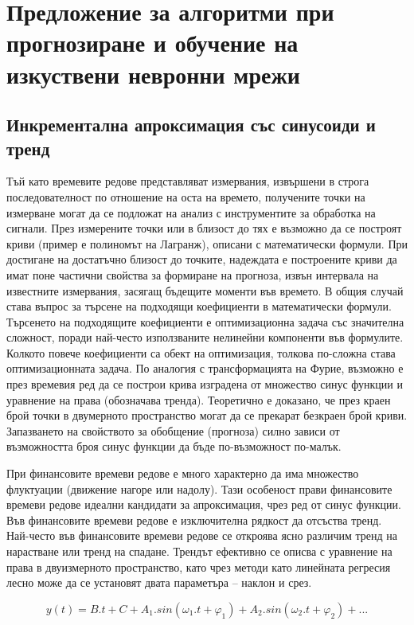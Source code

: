 ﻿\chapter{Предложение за алгоритми при прогнозиране и обучение на изкуствени невронни мрежи}

\section{Инкрементална апроксимация със синусоиди и тренд}

Тъй като времевите редове представляват измервания, извършени в строга последователност по отношение на оста на времето, получените точки на измерване могат да се подложат на анализ с инструментите за обработка на сигнали. През измерените точки или в близост до тях е възможно да се построят криви (пример е полиномът на Лагранж), описани с математически формули. При достигане на достатъчно близост до точките, надеждата е построените криви да имат поне частични свойства за формиране на прогноза, извън интервала на известните измервания, засягащ бъдещите моменти във времето. В общия случай става въпрос за търсене на подходящи коефициенти в математически формули. Търсенето на подходящите коефициенти е оптимизационна задача със значителна сложност, поради най-често използваните нелинейни компоненти във формулите. Колкото повече коефициенти са обект на оптимизация, толкова по-сложна става оптимизационната задача. По аналогия с трансформацията на Фурие, възможно е през времевия ред да се построи крива изградена от множество синус функции и уравнение на права (обозначава тренда). Теоретично е доказано, че през краен брой точки в двумерното пространство могат да се прекарат безкраен брой криви. Запазването на свойството за обобщение (прогноза) силно зависи от възможността броя синус функции да бъде по-възможност по-малък. 

При финансовите времеви редове е много характерно да има множество флуктуации (движение нагоре или надолу). Тази особеност прави финансовите времеви редове идеални кандидати за апроксимация, чрез ред от синус функции. Във финансовите времеви редове е изключителна рядкост да отсъства тренд. Най-често във финансовите времеви редове се откроява ясно различим тренд на нарастване или тренд на спадане. Трендът ефективно се описва с уравнение на права в двуизмерното пространство, като чрез методи като линейната регресия лесно може да се установят двата параметъра – наклон и срез. 

\begin{equation}  \label{equ001}
y(t) = B.t + C + A_1.sin(\omega_1.t+\varphi_1) + A_2.sin(\omega_2.t+\varphi_2) + ...
\end{equation}


